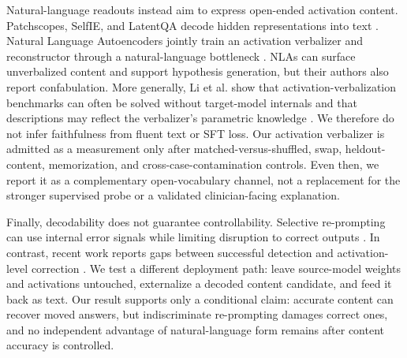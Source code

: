 Natural-language readouts instead aim to express open-ended activation
content. Patchscopes, SelfIE, and LatentQA decode hidden representations into
text \cite{ghandeharioun2024patchscopes, chen2024selfie,
pan2024latentqa}. Natural Language Autoencoders jointly train an activation
verbalizer and reconstructor through a natural-language bottleneck
\cite{anthropic2026nla}. NLAs can surface unverbalized content and support
hypothesis generation, but their authors also report confabulation. More
generally, Li et al. show that activation-verbalization benchmarks can often
be solved without target-model internals and that descriptions may reflect
the verbalizer's parametric knowledge \cite{li2026privileged}. We therefore
do not infer faithfulness from fluent text or SFT loss. Our activation
verbalizer is admitted as a measurement only after matched-versus-shuffled,
swap, heldout-content, memorization, and cross-case-contamination controls.
Even then, we report it as a complementary open-vocabulary channel, not a
replacement for the stronger supervised probe or a validated
clinician-facing explanation.

Finally, decodability does not guarantee controllability. Selective
re-prompting can use internal error signals while limiting disruption to
correct outputs \cite{sun2025selective}. In contrast, recent work reports
gaps between successful detection and activation-level correction
\cite{basu2026risk, vankadaru2026hallucination, liu2026decodability}. We test a
different deployment path: leave source-model weights and activations
untouched, externalize a decoded content candidate, and feed it back as text.
Our result supports only a conditional claim: accurate content can recover
moved answers, but indiscriminate re-prompting damages correct ones, and no
independent advantage of natural-language form remains after content
accuracy is controlled.

